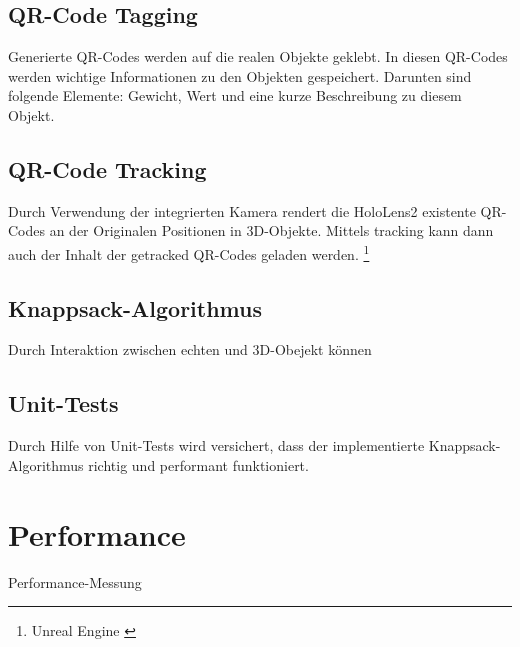 \subsection{QR-Code Tagging}
Generierte QR-Codes werden auf die realen Objekte geklebt. In diesen QR-Codes werden
wichtige Informationen zu den Objekten gespeichert. Darunten sind folgende Elemente:
Gewicht, Wert und eine kurze Beschreibung zu diesem Objekt.

\subsection{QR-Code Tracking}
Durch Verwendung der integrierten Kamera rendert die HoloLens2 existente QR-Codes an
der Originalen Positionen in 3D-Objekte. Mittels tracking kann dann auch der Inhalt
der getracked QR-Codes geladen werden. \footnote{Unreal Engine \cite{QRCodes}}

\subsection{Knappsack-Algorithmus}
Durch Interaktion zwischen echten und 3D-Obejekt können

\subsection{Unit-Tests}
Durch Hilfe von Unit-Tests wird versichert, dass der implementierte Knappsack-Algorithmus
richtig und performant funktioniert.

\section{Performance}
Performance-Messung




